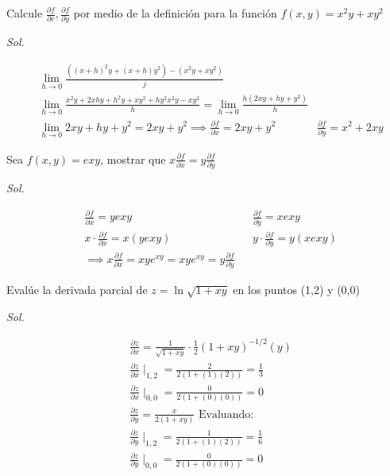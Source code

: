 \begin{example}
	Calcule $\frac{\partial f}{\partial c},\frac{\partial f}{\partial y}$ por medio de la definición para la función $f(x,y)=x^2y+xy^2$
\end{example}

\textit{ Sol. }

\begin{align*}
	 & \lim_{h\to 0}\frac{\left((x+h)^2y+(x+h)y^2\right)-\left(x^2y+xy^2\right)}{j}                             \\
	 & \lim_{h\to 0}\frac{x^2y+2xhy+h^2y+xy^2+hy^2x^2y-xy^2}{h}=\lim_{h\to 0}\frac{h\left(2xy+hy+y^2\right)}{h} \\
	 & \lim_{h\to 0}2xy+hy+y^2=2xy+y^2\implies \frac{\partial f}{\partial x}=2xy+y^2
	 & \frac{\partial f}{\partial y}=x^2+2xy
\end{align*}

\begin{example}
	Sea $f(x,y)=e{xy}$, mostrar que $x\frac{\partial f}{\partial x}=y\frac{\partial f}{\partial y}$
\end{example}

\textit{ Sol. }

\begin{align*}
	 & \frac{\partial f}{\partial x}=ye{xy}                                                     &  & \frac{\partial f}{\partial y}=xe{xy}                      \\
	 & x\cdot \frac{\partial f}{\partial x}=x\left(ye{xy}\right)                                &  & y\cdot \frac{\partial f}{\partial y}=y\left(xe{xy}\right) \\
	 & \implies x\frac{\partial f}{\partial x}=xye^{xy}=xye^{xy}=y\frac{\partial f}{\partial y}
\end{align*}

\begin{example}
	Evalúe la derivada parcial de $z=\ln{\sqrt{1+xy}}$ en los puntos (1,2) y (0,0)
\end{example}

\textit{ Sol. }

\begin{align*}
	 & \frac{\partial z}{\partial x}=\frac{1}{\sqrt{1+xy}}\cdot \frac{1}{2}(1+xy)^{-1/2}(y) \\
	 & \frac{\partial z}{\partial x}\mid_{1,2}=\frac{2}{2\left(1+(1)(2)\right)}=\frac{1}{3} \\
	 & \frac{\partial z}{\partial x}\mid_{0,0}=\frac{0}{2\left(1+(0)(0)\right)}=0           \\
	 & \frac{\partial z}{\partial y}=\frac{x}{2(1+xy)}\text{ Evaluando:}                    \\
	 & \frac{\partial z}{\partial y}\mid_{1,2}=\frac{1}{2\left(1+(1)(2)\right)}=\frac{1}{6} \\
	 & \frac{\partial z}{\partial y}\mid_{0,0}=\frac{0}{2\left(1+(0)(0)\right)}=0
\end{align*}

